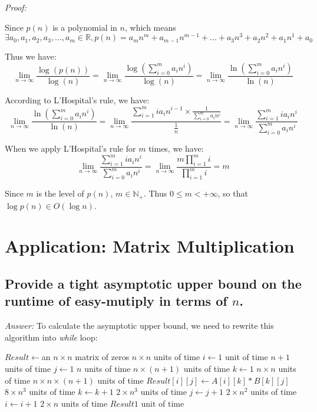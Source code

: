 \documentclass[11pt]{article}
\begin{document}
	\emph{Proof:}

	Since $p(n)$ is a polynomial in $n$, which means 
	\begin{equation*}
		\exists a_0,a_1,a_2,a_3,...,a_m \in \mathbb{R}, p(n) = a_mn^m + a_{m-1}n^{m-1}+...+a_3n^3+a_2n^2+a_1n^1+a_0
	\end{equation*}

	Thus we have:
	\begin{equation*}
		\lim_{n\to\infty} \frac{\log(p(n))}{\log(n)}=\lim_{n\to\infty}\frac{\log (\sum_{i=0}^{m}a_in^i)}{\log (n)}=\lim_{n\to\infty}\frac{\ln (\sum_{i=0}^{m}a_in^i)}{\ln (n)}
	\end{equation*}
	
	According to L'Hospital's rule, we have:
	\begin{equation*}
		\lim_{n\to\infty}\frac{\ln (\sum_{i=0}^{m}a_in^i)}{\ln (n)}= \lim_{n\to\infty}\frac{\sum_{i=1}^{m}ia_in^{i-1}\times\frac{1}{\sum_{i=0}^{m}a_in^i}}{\frac{1}{n}}=\lim_{n\to\infty}\frac{\sum_{i=1}^{m}ia_in^{i}}{\sum_{i=0}^{m}a_in^i}
	\end{equation*}
	
	When we apply L'Hospital's rule for $m$ times, we have:
	\begin{equation*}
		\lim_{n\to\infty}\frac{\sum_{i=1}^{m}ia_in^{i}}{\sum_{i=0}^{m}a_in^i}=\lim_{n\to\infty}\frac{m\prod_{i=1}^{m}i}{\prod_{i=1}^{m}i}=m
	\end{equation*}
	
	Since $m$ is the level of $p(n)$, $m\in \mathbb{N_+}$. Thus $0\leq m<+\infty$, so that $\log p(n) \in O(\log n)$.
\section{Application: Matrix Multiplication}
\subsection{Provide a tight asymptotic upper bound on the runtime of easy-mutiply in terms of $n$.}
	\emph{Answer:} To calculate the asymptotic upper bound, we need to rewrite this algorithm into \emph{while} loop:
	\begin{algorithmic}
		\State $Result \gets $an $n \times n$ matrix of zeros \Comment $n\times n$ units of time
		\State $i\gets 1$  unit of time
		 \Comment $n+1$ units of time
			\State $j\gets 1$ \Comment $n$ units of time
			 \Comment $n\times(n+1)$ units of time
				\State $k\gets 1$ \Comment $n\times n$ units of time
				 \Comment $n\times n\times (n+1)$ units of time
					\State $Result[i][j]\gets A[i][k]*B[k][j]$ \Comment $8\times n^{3}$ units of time
					\State $k\gets k+1$ \Comment $2\times n^3$ units of time
				\EndWhile
				\State $j\gets j+1$ \Comment $2\times n^2$ units of time
			\EndWhile
			\State $i\gets i+1$ \Comment $2\times n$ units of time
		\EndWhile
		\State \Return $Result$\Comment $1$ unit of time
	\end{algorithmic}
\end{document}
